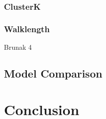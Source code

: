 \subsubsection*{ClusterK}

\subsubsection*{Walklength}

Brunak 4


\subsection{Model Comparison}


\section{Conclusion}





